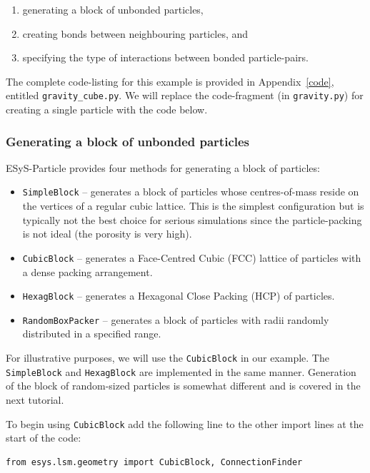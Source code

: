 \begin{enumerate}
\item generating a block of unbonded particles,
\item creating bonds between neighbouring particles, and
\item specifying the type of interactions between bonded particle-pairs.
\end{enumerate}

\noindent 
The complete code-listing for this example is provided in Appendix~\ref{code}, entitled \texttt{grav\+i\+ty\_\+cube.py}. We will replace the code-fragment (in \texttt{gravity.py}) for creating a single particle with the code below. 

\subsubsection{Generating a block of unbonded particles}

ESyS-Particle provides four methods for generating a block of particles: 

\begin{itemize}
\item \texttt{SimpleBlock} -- generates a block of particles whose centres-of-mass reside on the vertices of a regular cubic lattice. This is the simplest configuration but is typically not the best choice for serious simulations since the particle-packing is not ideal (the porosity is very high).
\item \texttt{CubicBlock} -- generates a Face-Centred Cubic (FCC) lattice of particles with a dense packing arrangement. 
\item \texttt{HexagBlock} -- generates a Hexagonal Close Packing (HCP) of particles.
\item \texttt{RandomBoxPacker} -- generates a block of particles with radii randomly distributed in a specified range.
\end{itemize}

\noindent For illustrative purposes, we will use the \texttt{CubicBlock} in our example. The \texttt{SimpleBlock} and \texttt{HexagBlock} are implemented in the same manner. Generation of the block of random-sized particles is somewhat different and is covered in the next tutorial.

To begin using \texttt{CubicBlock} add the following line to the other import lines at the start of the code:

\begin{verbatim}
from esys.lsm.geometry import CubicBlock, ConnectionFinder
\end{verbatim}

